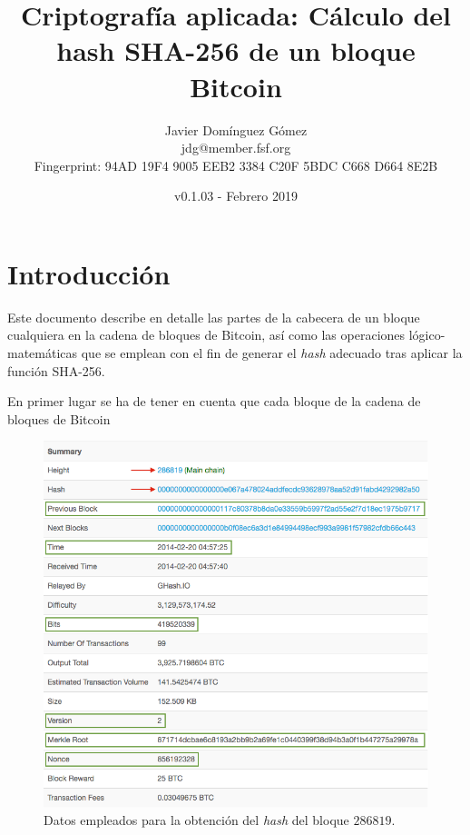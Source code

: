 \documentclass{article}
\title{\textbf{Criptografía aplicada: Cálculo del hash SHA-256 de un bloque Bitcoin}}
\author{Javier Domínguez Gómez \\
\small{jdg@member.fsf.org} \\
\small{Fingerprint: 94AD 19F4 9005 EEB2 3384 C20F 5BDC C668 D664 8E2B}}
\date{v0.1.03 - Febrero 2019}
\begin{document}
\maketitle

\tableofcontents{}

\section{Introducción}
    Este documento describe en detalle las partes de la cabecera de un bloque cualquiera en la cadena de bloques de Bitcoin, así como las operaciones lógico-matemáticas que se emplean con el fin de generar el \textit{hash} adecuado tras aplicar la función SHA-256.
    
    \vspace{3mm}
    En primer lugar se ha de tener en cuenta que cada bloque de la cadena de bloques de Bitcoin
    \begin{figure}[H]
    \centering
        \includegraphics[scale=0.47]{img/Bitcoin_block_SHA_256_Block_Data}
        \caption{Datos empleados para la obtención del \textit{hash} del bloque $286819$.}
    \end{figure}
    
\end{document}
